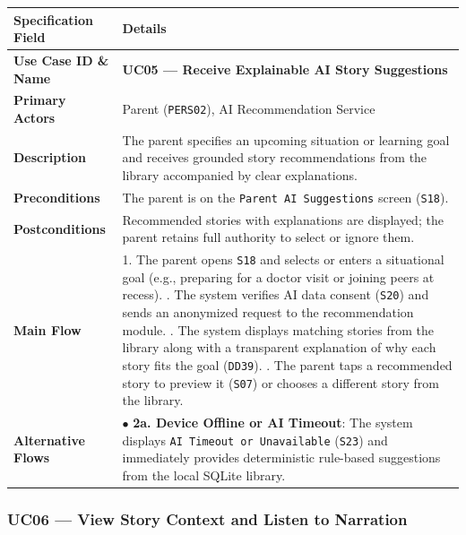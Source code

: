 \noindent\begin{xltabular}{\textwidth}{|p{4.0cm}|X|}
\hline
\textbf{Specification Field} & \textbf{Details} \\ \hline
\endhead
\textbf{Use Case ID \& Name} & \textbf{UC05 — Receive Explainable AI Story Suggestions} \\ \hline
\textbf{Primary Actors} & Parent (\texttt{PERS02}), AI Recommendation Service \\ \hline
\textbf{Description} & The parent specifies an upcoming situation or learning goal and receives grounded story recommendations from the library accompanied by clear explanations. \\ \hline
\textbf{Preconditions} & The parent is on the \texttt{Parent AI Suggestions} screen (\texttt{S18}). \\ \hline
\textbf{Postconditions} & Recommended stories with explanations are displayed; the parent retains full authority to select or ignore them. \\ \hline
\textbf{Main Flow} & 1. The parent opens \texttt{S18} and selects or enters a situational goal (e.g., preparing for a doctor visit or joining peers at recess). . The system verifies AI data consent (\texttt{S20}) and sends an anonymized request to the recommendation module. . The system displays matching stories from the library along with a transparent explanation of why each story fits the goal (\texttt{DD39}). . The parent taps a recommended story to preview it (\texttt{S07}) or chooses a different story from the library. \\ \hline
\textbf{Alternative Flows} & $\bullet$ \textbf{2a. Device Offline or AI Timeout}: The system displays \texttt{AI Timeout or Unavailable} (\texttt{S23}) and immediately provides deterministic rule-based suggestions from the local SQLite library. \\ \hline
\end{xltabular}



\subsubsection{UC06 — View Story Context and Listen to Narration}


